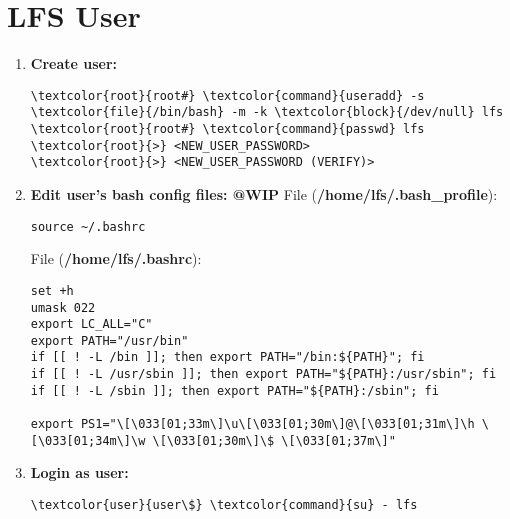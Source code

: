 \documentclass[10pt, a4paper, onecolumn, oneside, titlepage, openany]{book}
\begin{document}
\section{LFS User}
\begin{enumerate}
    \item \textbf{Create user:}
\begin{Verbatim}[commandchars=\\\{\}]
\textcolor{root}{root#} \textcolor{command}{useradd} -s \textcolor{file}{/bin/bash} -m -k \textcolor{block}{/dev/null} lfs
\textcolor{root}{root#} \textcolor{command}{passwd} lfs
\textcolor{root}{>} <NEW_USER_PASSWORD>
\textcolor{root}{>} <NEW_USER_PASSWORD (VERIFY)>
\end{Verbatim}
    \item \textbf{Edit user's bash config files: @WIP}
\newline File (\textbf{\textcolor{file}{/home/lfs/.bash\_profile}}):
\begin{lstlisting}[language=linux_file]
source ~/.bashrc
\end{lstlisting}
File (\textbf{\textcolor{file}{/home/lfs/.bashrc}}):
\begin{lstlisting}[language=linux_file]
set +h
umask 022
export LC_ALL="C"
export PATH="/usr/bin"
if [[ ! -L /bin ]]; then export PATH="/bin:${PATH}"; fi
if [[ ! -L /usr/sbin ]]; then export PATH="${PATH}:/usr/sbin"; fi
if [[ ! -L /sbin ]]; then export PATH="${PATH}:/sbin"; fi

export PS1="\[\033[01;33m\]\u\[\033[01;30m\]@\[\033[01;31m\]\h \[\033[01;34m\]\w \[\033[01;30m\]\$ \[\033[01;37m\]"
\end{lstlisting}
    \item \textbf{Login as user:}
\begin{Verbatim}[commandchars=\\\{\}]
\textcolor{user}{user\$} \textcolor{command}{su} - lfs
\end{Verbatim}
\end{enumerate}
\end{document}
